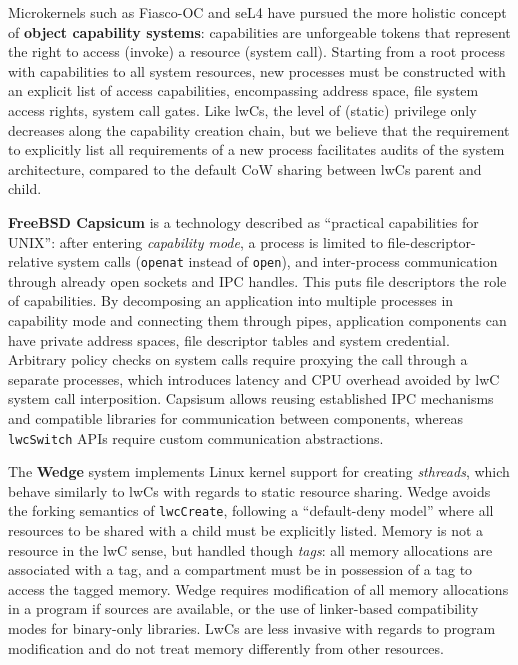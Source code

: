 \documentclass[10pt,twocolumn,a4paper]{article}
\begin{document}
Microkernels such as Fiasco-OC and seL4 have pursued the more holistic concept of \textbf{object capability systems}:
capabilities are unforgeable tokens that represent the right to access (invoke) a resource (system call).
Starting from a root process with capabilities to all system resources, new processes must be constructed with an explicit list of access capabilities, encompassing address space, file system access rights, system call gates.
Like lwCs, the level of (static) privilege only decreases along the capability creation chain, but we believe that the requirement to explicitly list all requirements of a new process facilitates audits of the system architecture, compared to the default CoW sharing between lwCs parent and child.
\cite{elphinstone2013l3}

\textbf{FreeBSD Capsicum} is a technology described as \enquote{practical capabilities for UNIX}:
after entering \textit{capability mode}, a process is limited to file-descriptor-relative system calls (\lstinline{openat} instead of \lstinline{open}), and inter-process communication through already open sockets and IPC handles.
This puts file descriptors the role of capabilities.
By decomposing an application into multiple processes in capability mode and connecting them through pipes, application components can have private address spaces, file descriptor tables and system credential.
Arbitrary policy checks on system calls require proxying the call through a separate processes, which introduces latency and CPU overhead avoided by lwC system call interposition.
Capsisum allows reusing established IPC mechanisms and compatible libraries for communication between components, whereas \lstinline{lwcSwitch} APIs require custom communication abstractions.
\cite{watson2010capsicum}


The \textbf{Wedge} system implements Linux kernel support for creating \textit{sthreads}, which behave similarly to lwCs with regards to static resource sharing.
Wedge avoids the forking semantics of \lstinline{lwcCreate}, following a \enquote{default-deny model} where all resources to be shared with a child must be explicitly listed.
Memory is not a resource in the lwC sense, but handled though \textit{tags}: all memory allocations are associated with a tag, and a compartment must be in possession of a tag to access the tagged memory.
Wedge requires modification of all memory allocations in a program if sources are available, or the use of linker-based compatibility modes for binary-only libraries.
LwCs are less invasive with regards to program modification and do not treat memory differently from other resources.
\cite{bittau2008wedge}
\end{document}
